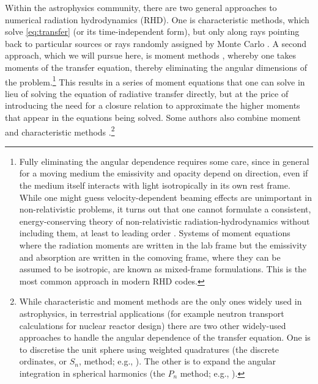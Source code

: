 \documentclass[fleqn,usenatbib]{mnras}
\begin{document}
Within the astrophysics community, there are two general approaches to numerical radiation hydrodynamics (RHD). One is characteristic methods, which solve \autoref{eq:transfer} (or its time-independent form), but only along rays pointing back to particular sources \citep[e.g.,][]{Abel02a, Rijkhorst06a, Krumholz07f} or rays randomly assigned by Monte Carlo \citep[e.g.,][]{Fleck71a, Tsang15a}. A second approach, which we will pursue here, is moment methods \citep[e.g.,][]{Mihalas_1984,Castor_2004}, whereby one takes moments of the transfer equation, thereby eliminating the angular dimensions of the problem.\footnote{Fully eliminating the angular dependence requires some care, since in general for a moving medium the emissivity and opacity depend on direction, even if the medium itself interacts with light isotropically in its own rest frame. While one might guess velocity-dependent beaming effects are unimportant in non-relativistic problems, it turns out that one cannot formulate a consistent, energy-conserving theory of non-relativistic radiation-hydrodynamics without including them, at least to leading order \citep{Mihalas82a, Lowrie99a, Krumholz_2007}. Systems of moment equations where the radiation moments are written in the lab frame but the emissivity and absorption are written in the comoving frame, where they can be assumed to be isotropic, are known as mixed-frame formulations. This is the most common approach in modern RHD codes.} This results in a series of moment equations that one can solve in lieu of solving the equation of radiative transfer directly, but at the price of introducing the need for a closure relation to approximate the higher moments that appear in the equations being solved. Some authors also combine moment and characteristic methods \citep[e.g.,][]{Rosen17a}.\footnote{While characteristic and moment methods are the only ones widely used in astrophysics, in terrestrial applications (for example neutron transport calculations for nuclear reactor design) there are two other widely-used approaches to handle the angular dependence of the transfer equation. One is to discretise the unit sphere using weighted quadratures (the discrete ordinates, or $S_n$, method; e.g., \citealt{Lathrop_1964,Adams97a}). The other is to expand the angular integration in spherical harmonics (the $P_n$ method; e.g., \citealt{Modest89a}).}
\end{document}
